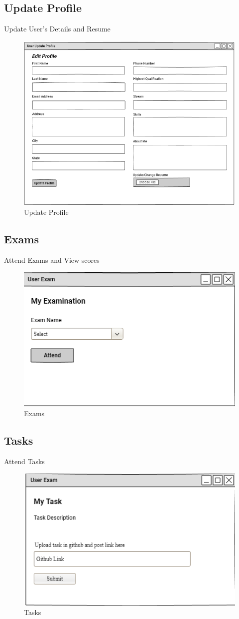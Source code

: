 \documentclass[a4paper,12pt]{report}
\begin{document}
\subsection {Update Profile}
Update User's Details and Resume
\begin{figure}[bph]
	\centering
	\includegraphics[width=.7\linewidth ]{img/user/userupdate}
	\caption{Update Profile}
\end{figure}

\subsection {Exams}
Attend Exams and View scores
\begin{figure}[bph]
	\centering
	\includegraphics[width=.4\linewidth]{img/user/userexm}
		\caption{Exams}
\end{figure}
\pagebreak

\subsection {Tasks}
Attend Tasks
\begin{figure}[bph]
	\centering
	\includegraphics[width=.6\linewidth ]{img/user/usertasks}
\caption{Tasks}
\end{figure}
\end{document}
